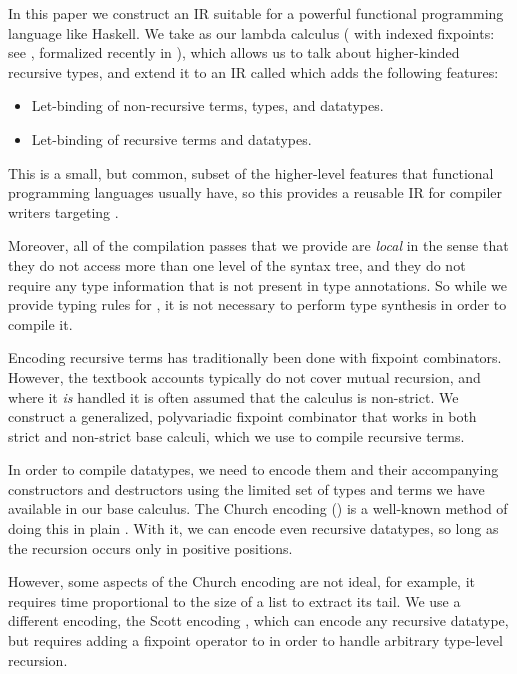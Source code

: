 In this paper we construct an IR
suitable for a powerful functional programming language like Haskell.
We take as our lambda calculus \FOMF{} (\FOM{} with indexed
fixpoints: see \cite[Chapter 30]{pierce2002types}, formalized recently in \cite{chapman2019systemf}), which allows us to talk about higher-kinded recursive types,
and extend it to an IR called \FIR{} which adds the following features:
\begin{itemize}
  \item Let-binding of non-recursive terms, types, and datatypes.
  \item Let-binding of recursive terms and datatypes.
\end{itemize}

This is a small, but common, subset of the higher-level features that
functional programming languages usually have, so this provides a reusable IR
for compiler writers targeting \FOMF{}.

Moreover, all of the compilation passes that we provide are \emph{local} in the
sense that they do not access more than one level of the syntax tree, and they
do not require any type information that is not present in type annotations. So
while we provide typing rules for \FIR{}, it is not necessary to perform type
synthesis in order to compile it.

Encoding recursive terms has traditionally been done with fixpoint combinators.
However, the textbook accounts typically do not cover mutual recursion, and
where it \emph{is} handled it is often assumed that the calculus is non-strict. We
construct a generalized, polyvariadic fixpoint combinator that works in both strict
and non-strict base calculi, which we use to compile recursive terms.

In order to compile datatypes, we need to encode them and their
accompanying constructors and destructors using the limited
set of types and terms we have available in our base calculus.
The Church encoding (\cite[Chapter 5.2, Chapter 23.4]{pierce2002types})
is a well-known method of doing this in plain \SF{}.
With it, we can encode even recursive datatypes, so long as the
recursion occurs only in positive positions.

However, some aspects of the Church encoding are not ideal, for example, it requires time
proportional to the size of a list to extract its tail.
We use a different encoding, the Scott encoding \cite{plotkin}, which can encode any
recursive datatype, but requires adding a fixpoint operator to \SF{} in order to
handle arbitrary type-level recursion.

